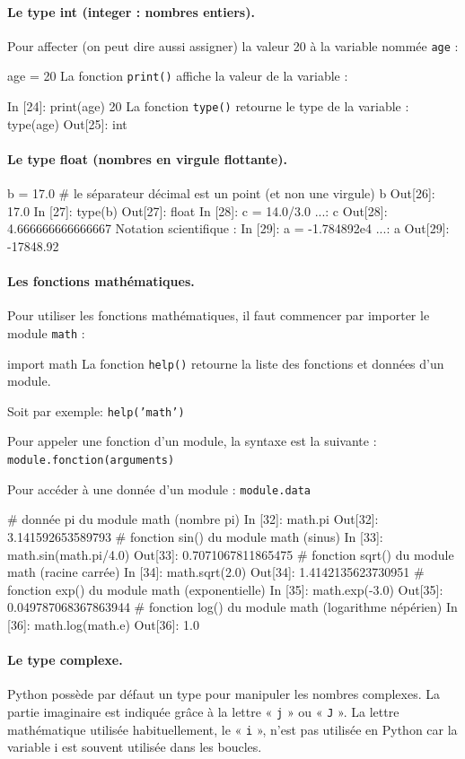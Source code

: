 \documentclass[%
oneside,                 %
final,                   %
10pt]{article}
\begin{document}
\paragraph{Le type int (integer : nombres entiers).}
Pour affecter (on peut dire aussi assigner) la valeur 20 à la variable nommée \texttt{age} :

\bipy
age = 20
\eipy
La fonction \texttt{print()} affiche la valeur de la variable :

\bipy
In [24]: print(age)
20
\eipy
La fonction \texttt{type()} retourne le type de la variable :
\bipy
type(age)
Out[25]: int
\eipy

\paragraph{Le type float (nombres en virgule flottante).}
\bipy
b = 17.0  # le séparateur décimal est un point (et non une virgule)
b
Out[26]: 17.0
In [27]: type(b)
Out[27]: float
In [28]: c = 14.0/3.0
    ...: c
Out[28]: 4.666666666666667
\eipy
Notation scientifique :
\bipy
In [29]: a = -1.784892e4
    ...: a
Out[29]: -17848.92
\eipy
\paragraph{Les fonctions mathématiques.}
Pour utiliser les fonctions mathématiques, il faut commencer par importer le module \texttt{math} :

\bipy
import math
\eipy
La fonction \texttt{help()} retourne la liste des fonctions et données d'un module.

Soit par exemple: \texttt{help('math')}


Pour appeler une fonction d'un module, la syntaxe est la suivante : \texttt{module.fonction(arguments)}

Pour accéder à une donnée d'un module : \texttt{module.data}

\bipy
 # donnée pi du module math (nombre pi)
In [32]: math.pi
Out[32]: 3.141592653589793
# fonction sin() du module math (sinus)
In [33]: math.sin(math.pi/4.0)
Out[33]: 0.7071067811865475
# fonction sqrt() du module math (racine carrée)
In [34]: math.sqrt(2.0)
Out[34]: 1.4142135623730951
# fonction exp() du module math (exponentielle)
In [35]: math.exp(-3.0)
Out[35]: 0.049787068367863944
# fonction log() du module math (logarithme népérien)
In [36]: math.log(math.e)
Out[36]: 1.0
\eipy

\paragraph{Le type complexe.}
Python possède par défaut un type pour manipuler les nombres complexes. La partie imaginaire est indiquée grâce à la lettre « \texttt{j} » ou « \texttt{J} ». La lettre mathématique utilisée habituellement, le « \texttt{i} », n’est pas utilisée en Python car la variable i est souvent utilisée dans les boucles.
\end{document}
